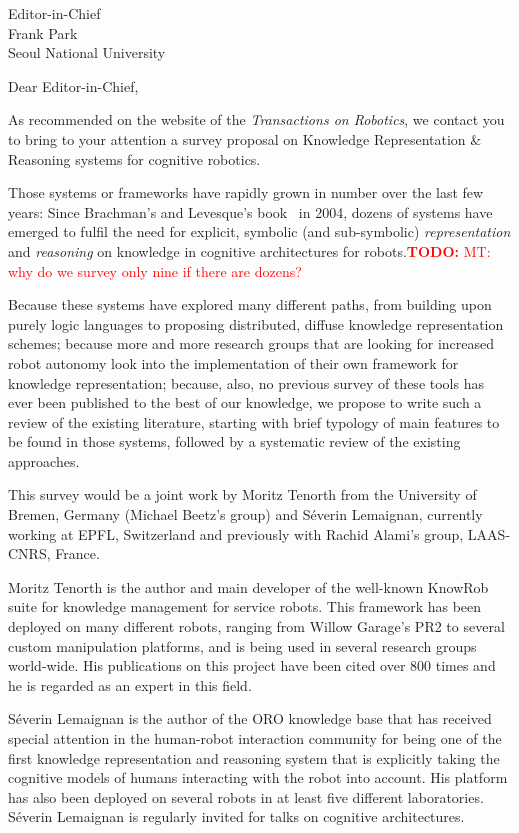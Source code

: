 \documentclass{letter}
\begin{document}
\newcommand{\todo}[1]{\textcolor{red}{\textbf{TODO:} #1}}

\begin{letter}{Editor-in-Chief \\ Frank Park \\ Seoul National University}
\opening{Dear Editor-in-Chief,}

As recommended on the website of the \emph{Transactions on Robotics}, we contact
you to bring to your attention a survey proposal on Knowledge Representation \&
Reasoning systems for cognitive robotics.

Those systems or frameworks have rapidly grown in number over the last few
years: Since Brachman's and Levesque's book~\cite{brachman2004knowledge} in 
2004, dozens of systems have emerged to fulfil the need for explicit, symbolic (and
sub-symbolic) \emph{representation} and \emph{reasoning} on knowledge in
cognitive architectures for robots.\todo{MT: why do we survey only nine if there are dozens?}

Because these systems have explored many different paths, from building upon purely
logic languages to proposing distributed, diffuse knowledge representation
schemes; because more and more research groups that are looking for increased
robot autonomy look into the implementation of their own framework for knowledge
representation; because, also, no previous survey of these tools has ever been
published to the best of our knowledge, we propose to write such a review of the
existing literature, starting with brief typology of main features to be found
in those systems, followed by a systematic review of the existing approaches.

This survey would be a joint work by Moritz Tenorth from the University of
Bremen, Germany (Michael Beetz's group) and Séverin Lemaignan, currently working
at EPFL, Switzerland and previously with Rachid Alami's group, LAAS-CNRS, France.

Moritz Tenorth is the author and main developer of the well-known {\sc KnowRob}
suite for knowledge management for service robots. This framework has been
deployed on many different robots, ranging from Willow Garage's PR2 to several
custom manipulation platforms, and is being used in several research groups 
world-wide. His publications on this project have been cited over 800 times 
and he is regarded as an expert in this field.

Séverin Lemaignan is the author of the {\sc ORO} knowledge base that has
received special attention in the human-robot interaction community for being
one of the first knowledge representation and reasoning system that is explicitly
taking the cognitive models of humans interacting with the robot into account. 
His platform has also been deployed on several robots in at least five different
laboratories. Séverin Lemaignan is regularly invited for talks on cognitive
architectures.


\end{letter}
\end{document}
